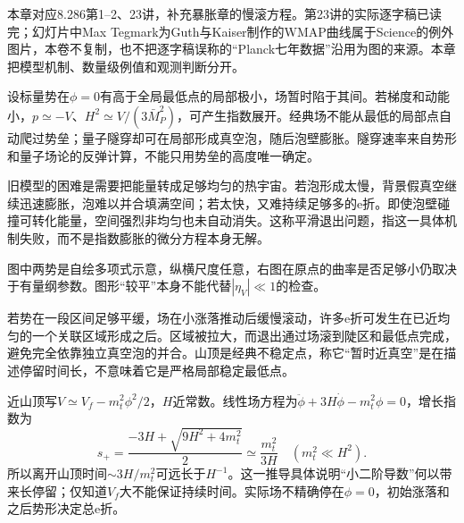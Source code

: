 本章对应8.286第1--2、23讲，补充暴胀章的慢滚方程。第23讲的实际逐字稿已读完；幻灯片中Max Tegmark为Guth与Kaiser制作的WMAP曲线属于Science的例外图片，本卷不复制，也不把逐字稿误称的“Planck七年数据”沿用为图的来源。本章把模型机制、数量级例值和观测判断分开。

设标量势在$\phi=0$有高于全局最低点的局部极小，场暂时陷于其间。若梯度和动能小，$p\simeq-V$、$H^2\simeq V/(3\bar M_P^2)$，可产生指数展开。经典场不能从最低的局部点自动爬过势垒；量子隧穿却可在局部形成真空泡，随后泡壁膨胀。隧穿速率来自势形和量子场论的反弹计算，不能只用势垒的高度唯一确定。

旧模型的困难是需要把能量转成足够均匀的热宇宙。若泡形成太慢，背景假真空继续迅速膨胀，泡难以并合填满空间；若太快，又难持续足够多的e折。即使泡壁碰撞可转化能量，空间强烈非均匀也未自动消失。这称平滑退出问题，指这一具体机制失败，而不是指数膨胀的微分方程本身无解。

\begin{center}\hfill
{}\end{center}
图中两势是自绘多项式示意，纵横尺度任意，右图在原点的曲率是否足够小仍取决于有量纲参数。图形“较平”本身不能代替$|\eta_V|\ll1$的检查。

若势在一段区间足够平缓，场在小涨落推动后缓慢滚动，许多e折可发生在已近均匀的一个关联区域形成之后。区域被拉大，而退出通过场滚到陡区和最低点完成，避免完全依靠独立真空泡的并合。山顶是经典不稳定点，称它“暂时近真空”是在描述停留时间长，不意味着它是严格局部稳定最低点。

近山顶写$V\simeq V_f-m_t^2\phi^2/2$，$H$近常数。线性场方程为$\ddot\phi+3H\dot\phi-m_t^2\phi=0$，增长指数为
\[
 s_+=\frac{-3H+\sqrt{9H^2+4m_t^2}}2\simeq\frac{m_t^2}{3H}
 \quad(m_t^2\ll H^2).
\]
所以离开山顶时间$\sim3H/m_t^2$可远长于$H^{-1}$。这一推导具体说明“小二阶导数”何以带来长停留；仅知道$V_f$大不能保证持续时间。实际场不精确停在$\phi=0$，初始涨落和之后势形决定总e折。

